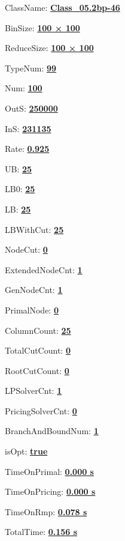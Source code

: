\documentclass[11pt]{article}
\begin{document}
\pagestyle{empty}


ClassName: \underline{\textbf{Class_05.2bp-46}}
\par
BinSize: \underline{\textbf{100 × 100}}
\par
ReduceSize: \underline{\textbf{100 × 100}}
\par
TypeNum: \underline{\textbf{99}}
\par
Num: \underline{\textbf{100}}
\par
OutS: \underline{\textbf{250000}}
\par
InS: \underline{\textbf{231135}}
\par
Rate: \underline{\textbf{0.925}}
\par
UB: \underline{\textbf{25}}
\par
LB0: \underline{\textbf{25}}
\par
LB: \underline{\textbf{25}}
\par
LBWithCut: \underline{\textbf{25}}
\par
NodeCut: \underline{\textbf{0}}
\par
ExtendedNodeCnt: \underline{\textbf{1}}
\par
GenNodeCnt: \underline{\textbf{1}}
\par
PrimalNode: \underline{\textbf{0}}
\par
ColumnCount: \underline{\textbf{25}}
\par
TotalCutCount: \underline{\textbf{0}}
\par
RootCutCount: \underline{\textbf{0}}
\par
LPSolverCnt: \underline{\textbf{1}}
\par
PricingSolverCnt: \underline{\textbf{0}}
\par
BranchAndBoundNum: \underline{\textbf{1}}
\par
isOpt: \underline{\textbf{true}}
\par
TimeOnPrimal: \underline{\textbf{0.000 s}}
\par
TimeOnPricing: \underline{\textbf{0.000 s}}
\par
TimeOnRmp: \underline{\textbf{0.078 s}}
\par
TotalTime: \underline{\textbf{0.156 s}}
\par
\newpage


\end{document}
